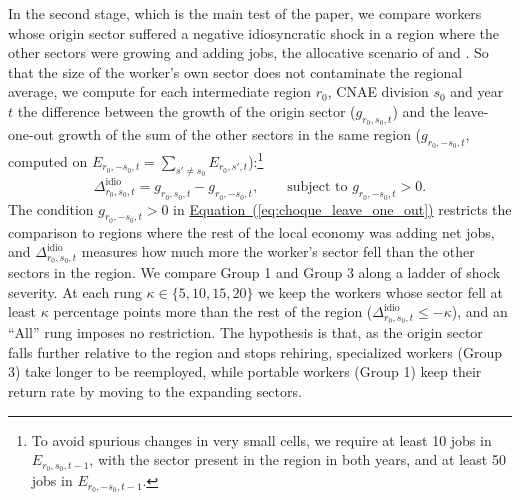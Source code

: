 \documentclass[11pt,a4paper]{article}
\let\citetorig\citet
\renewcommand{\citet}[1]{{\color{citeblue}\citetorig{#1}}}
\begin{document}
In the second stage, which is the main test of the paper, we compare workers whose origin sector suffered a negative idiosyncratic shock in a region where the other sectors were growing and adding jobs, the allocative scenario of \citet{lilien1982} and \citet{darougheh2024}. So that the size of the worker's own sector does not contaminate the regional average, we compute for each intermediate region $r_0$, CNAE division $s_0$ and year $t$ the difference between the growth of the origin sector ($g_{r_0,s_0,t}$) and the leave-one-out growth of the sum of the other sectors in the same region ($g_{r_0,-s_0,t}$, computed on $E_{r_0,-s_0,t} = \sum_{s' \neq s_0} E_{r_0,s',t}$):\footnote{To avoid spurious changes in very small cells, we require at least 10 jobs in $E_{r_0,s_0,t-1}$, with the sector present in the region in both years, and at least 50 jobs in $E_{r_0,-s_0,t-1}$.}
\begin{equation}
\Delta^{\text{idio}}_{r_0,s_0,t} = g_{r_0,s_0,t} - g_{r_0,-s_0,t}, \qquad \text{subject to } g_{r_0,-s_0,t} > 0.
\label{eq:choque_leave_one_out}
\end{equation}
The condition $g_{r_0,-s_0,t} > 0$ in \hyperref[eq:choque_leave_one_out]{Equation~(\ref*{eq:choque_leave_one_out})} restricts the comparison to regions where the rest of the local economy was adding net jobs, and $\Delta^{\text{idio}}_{r_0,s_0,t}$ measures how much more the worker's sector fell than the other sectors in the region. We compare Group 1 and Group 3 along a ladder of shock severity. At each rung $\kappa \in \{5, 10, 15, 20\}$ we keep the workers whose sector fell at least $\kappa$ percentage points more than the rest of the region ($\Delta^{\text{idio}}_{r_0,s_0,t} \le -\kappa$), and an ``All'' rung imposes no restriction. The hypothesis is that, as the origin sector falls further relative to the region and stops rehiring, specialized workers (Group 3) take longer to be reemployed, while portable workers (Group 1) keep their return rate by moving to the expanding sectors.
\end{document}
